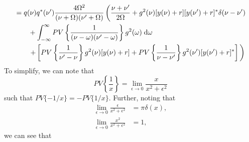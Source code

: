 \documentclass{article}
\begin{document}
\begin{equation}
\begin{split}
&= q(\nu)q^*(\nu')\frac{4\Omega^2}{(\nu + \Omega)(\nu' + \Omega)}\left(\frac{\nu + \nu'}{2\Omega} + g^2(\nu)[y(\nu) + r][y(\nu') + r]^*\delta(\nu - \nu') \vphantom{\int_0^\infty} \right.\\
&\qquad +  \int_{-\infty}^\infty PV\left\{\frac{1}{(\nu - \omega)(\nu' - \omega)}\right\}g^2(\omega)\;\mathrm{d}\omega\\
&\qquad\left. + \left[PV\left\{\frac{1}{\nu' - \nu}\right\}g^2(\nu)[y(\nu) + r] + PV\left\{\frac{1}{\nu - \nu'}\right\}g^2(\nu')[y(\nu') + r]^*\right] \vphantom{\int_0^\infty} \right)
\end{split}
\end{equation}
To simplify, we can note that
\begin{equation}
PV\left\{\frac{1}{x}\right\} = \lim_{\epsilon\to0}\frac{x}{x^2 + \epsilon^2}
\end{equation}
such that $PV\{-1/x\} = -PV\{1/x\}$. Further, noting that
\begin{equation}
\begin{split}
\lim_{\epsilon\to0}\frac{\epsilon}{x^2 + \epsilon^2} &= \pi\delta(x),\\
\lim_{\epsilon\to0}\frac{x^2}{x^2 + \epsilon^2} &= 1,
\end{split}
\end{equation}
we can see that
\end{document}
